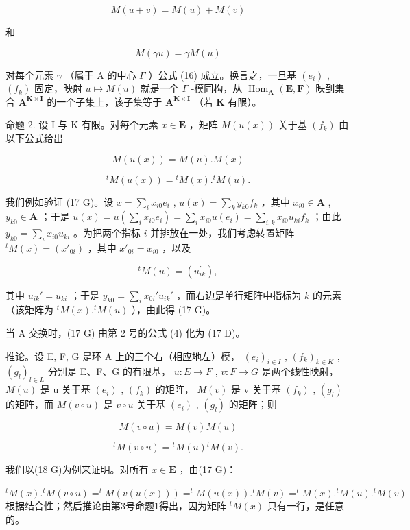 \[
M (u + v) = M (u) + M (v)\tag{15}
\]

和

\[
M (\gamma u) = \gamma M (u)\tag{16}
\]

对每个元素 \(\gamma\) （属于 A 的中心 \(\Gamma\) ）公式 (16) 成立。换言之，一旦基 \((e_i)\) , \((f_k)\) 固定，映射 \(u \mapsto M(u)\) 就是一个 \(\Gamma\) -模同构，从 \(\operatorname{Hom}_{\mathbf{A}}(\mathbf{E}, \mathbf{F})\) 映到集合 \(\mathbf{A}^{\mathbf{K} \times \mathbf{I}}\) 的一个子集上，该子集等于 \(\mathbf{A}^{\mathbf{K} \times \mathbf{I}}\) （若 \(\mathbf{K}\) 有限）。

命题 2. 设 I 与 K 有限。对每个元素 \(x \in \mathbf{E}\) ，矩阵 \(M(u(x))\) 关于基 \((f_k)\) 由以下公式给出

\[
M (u (x)) = M (u). M (x)\tag{17 D}
\]

\[
{ } ^ { t } M ( u ( x ) ) = { } ^ { t } M ( x ) . { } ^ { t } M ( u ) .\tag{17 G}
\]

我们例如验证 (17 G)。设 \(x = \sum_{i} x_{i0} e_i\) , \(u(x) = \sum_{k} y_{k0} f_k\) ，其中 \(x_{i0} \in \mathbf{A}\) , \(y_{k0} \in \mathbf{A}\) ；于是 \(u(x) = u\left(\sum_{i} x_{i0} e_i\right) = \sum_{i} x_{i0} u(e_i) = \sum_{i, k} x_{i0} u_{ki} f_k\) ；由此 \(y_{k0} = \sum_{i} x_{i0} u_{ki}\) 。为把两个指标 \(i\) 并排放在一处，我们考虑转置矩阵 \(^t M(x) = (x'_{0i})\) ，其中 \(x'_{0i} = x_{i0}\) ，以及

\[
{ } ^ { t } M ( u ) = \left( u _ { i k } ^ { \prime } \right) ,
\]

其中 \(u_{ik}' = u_{ki}\) ；于是 \(y_{k0} = \sum_{i} x_{0i}' u_{ik}'\) ，而右边是单行矩阵中指标为 \(k\) 的元素（该矩阵为 \(^t M(x).^t M(u)\) ），由此得 (17 G)。

当 A 交换时，(17 G) 由第 2 号的公式 (4) 化为 (17 D)。

推论。设 E, F, G 是环 A 上的三个右（相应地左）模， \((e_{i})_{i\in I}\) , \((f_{k})_{k\in K}\) , \((g_{l})_{l\in L}\) 分别是 E、F、G 的有限基， \(u:E\to F\) , \(v:F\to G\) 是两个线性映射， \(M(u)\) 是 u 关于基 \((e_{i})\) , \((f_{k})\) 的矩阵， \(M(v)\) 是 v 关于基 \((f_{k})\) , \((g_{l})\) 的矩阵，而 \(M(v\circ u)\) 是 \(v\circ u\) 关于基 \((e_{i})\) , \((g_{l})\) 的矩阵；则

\[
M (v \circ u) = M (v) M (u)\tag{18 D}
\]

\[
{ } ^ { t } M ( v \circ u ) = { } ^ { t } M ( u ) { } ^ { t } M ( v ) .\tag{18 G}
\]

我们以(18 G)为例来证明。对所有 \(x \in \mathbf{E}\) ，由(17 G)：

\(^{t}M(x).^{t}M(v\circ u)=^{t}M(v(u(x)))=^{t}M(u(x)).^{t}M(v)=^{t}M(x).^{t}M(u).^{t}M(v)\) 根据结合性；然后推论由第3号命题1得出，因为矩阵 \(^{t}M(x)\) 只有一行，是任意的。


